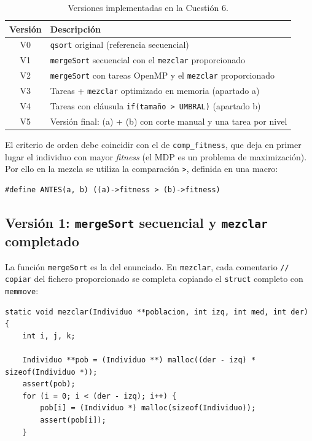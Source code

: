 \documentclass[12pt]{article}
\begin{document}
\begin{enumerate}
\begin{table}[htbp]
    \centering
    \small
    \begin{tabular}{cl}
        \toprule
        \textbf{Versión} & \textbf{Descripción} \\
        \midrule
        V0 & \texttt{qsort} original (referencia secuencial) \\
        V1 & \texttt{mergeSort} secuencial con el \texttt{mezclar} proporcionado \\
        V2 & \texttt{mergeSort} con tareas OpenMP y el \texttt{mezclar} proporcionado \\
        V3 & Tareas + \texttt{mezclar} optimizado en memoria \hfill (apartado a) \\
        V4 & Tareas con cláusula \texttt{if(tamaño > UMBRAL)} \hfill (apartado b) \\
        V5 & Versión final: (a) + (b) con corte manual y una tarea por nivel \\
        \bottomrule
    \end{tabular}
    \caption{Versiones implementadas en la Cuestión 6.}
    \label{tab:c6_versiondses}
\end{table}
 
El criterio de orden debe coincidir con el de \texttt{comp\_fitness}, que deja en primer lugar el individuo con mayor \textit{fitness} (el MDP es un problema de maximización). Por ello en la mezcla se utiliza la comparación \texttt{>}, definida en una macro:
 
\begin{lstlisting}[style=EstiloC]
#define ANTES(a, b) ((a)->fitness > (b)->fitness)
\end{lstlisting}
 
\subsection*{Versión 1: \texttt{mergeSort} secuencial y \texttt{mezclar} completado}
 
La función \texttt{mergeSort} es la del enunciado. En \texttt{mezclar}, cada comentario \texttt{// copiar} del fichero proporcionado se completa copiando el \texttt{struct} completo con \texttt{memmove}:
 
\begin{lstlisting}[style=EstiloC]
static void mezclar(Individuo **poblacion, int izq, int med, int der)
{
    int i, j, k;
 
    Individuo **pob = (Individuo **) malloc((der - izq) * sizeof(Individuo *));
    assert(pob);
    for (i = 0; i < (der - izq); i++) {
        pob[i] = (Individuo *) malloc(sizeof(Individuo));
        assert(pob[i]);
    }
 

\end{lstlisting}
\end{enumerate}
\end{document}
